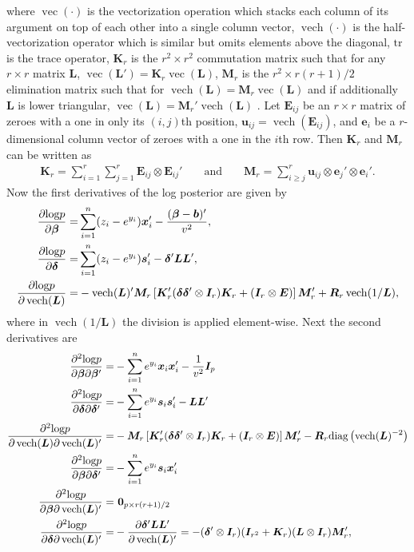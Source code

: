 \documentclass[12pt]{article}
\def\diag{\hbox{diag}}
\def\diag{\hbox{diag}}
\def\log{\hbox{log}}
\DeclareMathOperator{\vect}{vec}
\DeclareMathOperator{\vech}{vech}
\begin{document}
where $\vect(\cdot)$ is the vectorization operation which stacks each column of its argument on top of each other into a single column vector, $\vech(\cdot)$ is the half-vectorization operator which is similar but omits elements above the diagonal, $\mathrm{tr}$ is the trace operator, $\bm{K}_r$ is the $r^2\times r^2$ commutation matrix such that for any $r\times r$ matrix $\bm{L}$, $\vect(\bm{L}') = \bm{K}_r\vect(\bm{L})$, $\bm{M}_r$ is the $r^2\times r(r+1)/2$ elimination matrix such that for $\vech(\bm{L}) = \bm{M}_r\vect(\bm{L})$ and if additionally $\bm{L}$ is lower triangular, $\vect(\bm{L}) = \bm{M}_r'\vech(\bm{L})$ \citep{magnus1980elimination,magnus1988linear}. Let $\bm{E}_{ij}$ be an $r\times r$ matrix of zeroes with a one in only its $(i,j)$th position, $\bm{u}_{ij} = \vech(\bm{E}_{ij})$, and $\bm{e}_i$ be a $r$-dimensional column vector of zeroes with a one in the $i$th row. Then $\bm{K}_r$ and $\bm{M}_r$ can be written as
\begin{align*}
\bm{K}_r = \sum_{i=1}^r\sum_{j=1}^r\bm{E}_{ij} \otimes \bm{E}_{ij}' && \mbox{ and } &&\bm{M}_r = \sum_{i\ge j}^r\bm{u}_{ij}\otimes \bm{e}_j'\otimes \bm{e}_i'.
\end{align*}
Now the first derivatives of the log posterior are given by
\begin{align*}
\frac{\partial \log p}{\partial \bm{\beta}} =& \sum_{i=1}^n(z_i - e^{y_i})\bm{x}_i' - \frac{(\bm{\beta} - \bm{b})'}{v^2},\\
\frac{\partial \log p}{\partial \bm{\delta}} =& \sum_{i=1}^n(z_i - e^{y_i})\bm{s}_i' - \bm{\delta}'\bm{L}\bm{L}',\\
\frac{\partial \log p}{\partial \vech(\bm{L})} =& -\vech(\bm{L})'\bm{M}_r\left[\bm{K}_r'(\bm{\delta}\bm{\delta}'\otimes \bm{I}_r)\bm{K}_r + (\bm{I}_r\otimes \bm{E})\right]\bm{M}_r' + \bm{R}_r\vech(1/\bm{L}),
\end{align*}
where in $\vech(1/\bm{L})$ the division is applied element-wise. Next the second derivatives are
\begin{align*}
\frac{\partial^2 \log p}{\partial \bm{\beta} \partial \bm{\beta}'} =& -\sum_{i=1}^ne^{y_i}\bm{x}_i\bm{x}_i' - \frac{1}{v^2}\bm{I}_p\\
\frac{\partial^2 \log p}{\partial \bm{\delta} \partial \bm{\delta}'} =&-\sum_{i=1}^ne^{y_i}\bm{s}_i\bm{s}_i' - \bm{L}\bm{L}'\\
\frac{\partial^2 \log p}{\partial \vech(\bm{L}) \partial \vech(\bm{L})'} =& -\bm{M}_r\left[\bm{K}_r'(\bm{\delta}\bm{\delta}'\otimes \bm{I}_r)\bm{K}_r + (\bm{I}_r\otimes \bm{E})\right]\bm{M}_r' - \bm{R}_r\diag\left(\vech(\bm{L})^{-2}\right)\\
\frac{\partial^2 \log p}{\partial \bm{\beta} \partial \bm{\delta}'} =& -\sum_{i=1}^ne^{y_i}\bm{s}_i\bm{x}_i'\\
\frac{\partial^2 \log p}{\partial \bm{\beta} \partial \vech(\bm{L})'} =&\  \bm{0}_{p\times r(r+1)/2}\\
\frac{\partial^2 \log p}{\partial \bm{\delta} \partial \vech(\bm{L})'} =&-\frac{\partial \bm{\delta}'\bm{L}\bm{L}'}{\partial \vech(\bm{L})'} =  -(\bm{\delta}' \otimes \bm{I}_r)(\bm{I}_{r^2} + \bm{K}_r)(\bm{L}\otimes \bm{I}_r) \bm{M}_r',
\end{align*}
\end{document}
